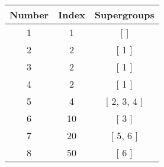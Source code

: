 \begin{center}
\begin{longtable}[H]{|| c c c ||}
\hline
Number &  Index &  Supergroups
\\\hline
1 & 1 & [  ]
\\\hline
2 & 2 & [ 1 ]
\\\hline
3 & 2 & [ 1 ]
\\\hline
4 & 2 & [ 1 ]
\\\hline
5 & 4 & [ 2, 3, 4 ]
\\\hline
6 & 10 & [ 3 ]
\\\hline
7 & 20 & [ 5, 6 ]
\\\hline
8 & 50 & [ 6 ]
\\\hline
\end{longtable}
\end{center}
